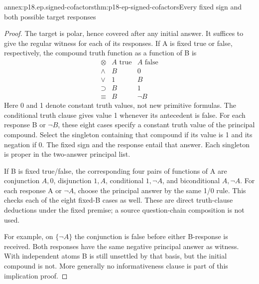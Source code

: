 \begin{annexitem}{annex:p18.ep.signed-cofactors}{thm:p18-ep-signed-cofactors}{Every fixed sign and both possible target responses}
\begin{proof}
The target is polar, hence covered after any initial answer. It suffices
to give the regular witness for each of its responses. If A is fixed true
or false, respectively, the compound truth function as a function of B is
\[
\begin{array}{c|c|c}
 \otimes&A\text{ true}&A\text{ false}\\\hline
 \land&B&0\\
 \lor&1&B\\
 \supset&B&1\\
 \equiv&B&\neg B
\end{array}
\]
Here 0 and 1 denote constant truth values, not new primitive formulas.
The conditional truth clause gives value 1 whenever its antecedent is false.
For each response B or \(\neg B\), these eight cases specify a
constant truth value of the principal compound. Select the singleton
containing that compound if its value is 1 and its negation if 0.
The fixed sign and the response entail that answer. Each singleton is
proper in the two-answer principal list.

If B is fixed true/false, the corresponding four pairs of functions of A
are conjunction \(A,0\), disjunction \(1,A\), conditional
\(1,\neg A\), and biconditional \(A,\neg A\). For each response
A or \(\neg A\), choose the principal answer by the same 1/0 rule.
This checks each of the eight fixed-B cases as well. These are direct
truth-clause deductions under the fixed premise; a source question-chain
composition is not used.

For example, on \(\{\neg A\}\) the conjunction is false before
either B-response is received. Both responses have the same negative
principal answer as witness. With independent atoms B is still unsettled
by that basis, but the initial compound is not. More generally no
informativeness clause is part of this implication proof.
\end{proof}
\end{annexitem}

